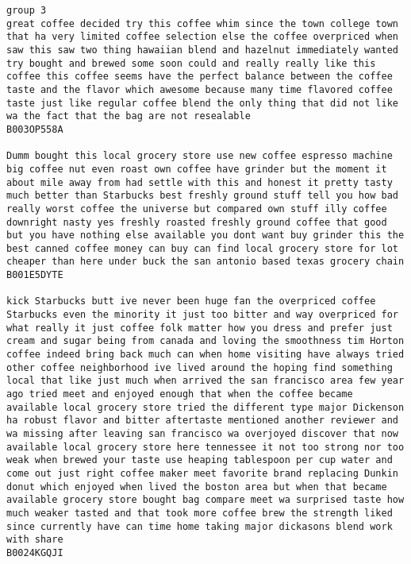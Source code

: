 \documentclass[11pt]{article}
\begin{document}
    \begin{Verbatim}[commandchars=\\\{\}]
group 3
great coffee decided try this coffee whim since the town college town that ha very limited coffee selection else the coffee overpriced when saw this saw two thing hawaiian blend and hazelnut immediately wanted try bought and brewed some soon could and really really like this coffee this coffee seems have the perfect balance between the coffee taste and the flavor which awesome because many time flavored coffee taste just like regular coffee blend the only thing that did not like wa the fact that the bag are not resealable
B003OP558A

Dumm bought this local grocery store use new coffee espresso machine big coffee nut even roast own coffee have grinder but the moment it about mile away from had settle with this and honest it pretty tasty much better than Starbucks best freshly ground stuff tell you how bad really worst coffee the universe but compared own stuff illy coffee downright nasty yes freshly roasted freshly ground coffee that good but you have nothing else available you dont want buy grinder this the best canned coffee money can buy can find local grocery store for lot cheaper than here under buck the san antonio based texas grocery chain
B001E5DYTE

kick Starbucks butt ive never been huge fan the overpriced coffee Starbucks even the minority it just too bitter and way overpriced for what really it just coffee folk matter how you dress and prefer just cream and sugar being from canada and loving the smoothness tim Horton coffee indeed bring back much can when home visiting have always tried other coffee neighborhood ive lived around the hoping find something local that like just much when arrived the san francisco area few year ago tried meet and enjoyed enough that when the coffee became available local grocery store tried the different type major Dickenson ha robust flavor and bitter aftertaste mentioned another reviewer and wa missing after leaving san francisco wa overjoyed discover that now available local grocery store here tennessee it not too strong nor too weak when brewed your taste use heaping tablespoon per cup water and come out just right coffee maker meet favorite brand replacing Dunkin donut which enjoyed when lived the boston area but when that became available grocery store bought bag compare meet wa surprised taste how much weaker tasted and that took more coffee brew the strength liked since currently have can time home taking major dickasons blend work with share
B0024KGQJI


\end{Verbatim}
\end{document}
